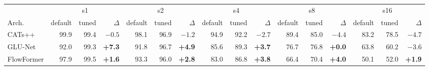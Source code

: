 \begin{tabular}{l rrr rrr rrr rrr rrr}
\toprule
  & \multicolumn{3}{c}{s1} & \multicolumn{3}{c}{s2} & \multicolumn{3}{c}{s4} & \multicolumn{3}{c}{s8} & \multicolumn{3}{c}{s16} \\
\cmidrule(lr){2-4} \cmidrule(lr){5-7} \cmidrule(lr){8-10} \cmidrule(lr){11-13} \cmidrule(lr){14-16}
Arch. & default & tuned & $\Delta$ & default & tuned & $\Delta$ & default & tuned & $\Delta$ & default & tuned & $\Delta$ & default & tuned & $\Delta$ \\
\midrule
CATs++ & 99.9 & 99.4 & $-0.5$ & 98.1 & 96.9 & $-1.2$ & 94.9 & 92.2 & $-2.7$ & 89.4 & 85.0 & $-4.4$ & 83.2 & 78.5 & $-4.7$ \\
GLU-Net & 92.0 & 99.3 & \textbf{+7.3} & 91.8 & 96.7 & \textbf{+4.9} & 85.6 & 89.3 & \textbf{+3.7} & 76.7 & 76.8 & \textbf{+0.0} & 63.8 & 60.2 & $-3.6$ \\
FlowFormer & 97.9 & 99.5 & \textbf{+1.6} & 93.3 & 96.0 & \textbf{+2.8} & 83.0 & 86.8 & \textbf{+3.8} & 66.4 & 70.4 & \textbf{+4.0} & 50.1 & 52.0 & \textbf{+1.9} \\
\bottomrule
\end{tabular}

